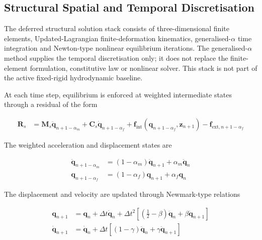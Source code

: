 \subsection{Structural Spatial and Temporal Discretisation}
\label{subsec:res_str_sim_spatial_temporal_discretisation}

The deferred structural solution stack consists of three-dimensional finite elements, Updated-Lagrangian finite-deformation kinematics, generalised-\(\alpha\) time integration and Newton-type nonlinear equilibrium iterations. The generalised-\(\alpha\) method supplies the temporal discretisation only; it does not replace the finite-element formulation, constitutive law or nonlinear solver. This stack is not part of the active fixed-rigid hydrodynamic baseline.

At each time step, equilibrium is enforced at weighted intermediate states through a residual of the form

\begin{align}
\bm{R}_{s}
&=
\bm{M}_{s}\ddot{\bm{q}}_{n+1-\alpha_{m}}
+
\bm{C}_{s}\dot{\bm{q}}_{n+1-\alpha_{f}}
+
\bm{f}_{\mathrm{int}}\!\left(\bm{q}_{n+1-\alpha_{f}},\bm{z}_{n+1}\right)
-
\bm{f}_{\mathrm{ext},n+1-\alpha_{f}}
\label{eq:res_str_sim_generalised_alpha_residual}
\end{align}

The weighted acceleration and displacement states are

\begin{align}
\ddot{\bm{q}}_{n+1-\alpha_{m}}
&=
\left(1-\alpha_{m}\right)\ddot{\bm{q}}_{n+1}
+
\alpha_{m}\ddot{\bm{q}}_{n}
\label{eq:res_str_sim_weighted_acceleration}
\\
\bm{q}_{n+1-\alpha_{f}}
&=
\left(1-\alpha_{f}\right)\bm{q}_{n+1}
+
\alpha_{f}\bm{q}_{n}
\label{eq:res_str_sim_weighted_displacement}
\end{align}

The displacement and velocity are updated through Newmark-type relations

\begin{align}
\bm{q}_{n+1}
&=
\bm{q}_{n}
+
\Delta t\dot{\bm{q}}_{n}
+
\Delta t^{2}
\left[
\left(\frac{1}{2}-\beta\right)\ddot{\bm{q}}_{n}
+
\beta\ddot{\bm{q}}_{n+1}
\right]
\label{eq:res_str_sim_generalised_alpha_displacement_update}
\\
\dot{\bm{q}}_{n+1}
&=
\dot{\bm{q}}_{n}
+
\Delta t
\left[
\left(1-\gamma\right)\ddot{\bm{q}}_{n}
+
\gamma\ddot{\bm{q}}_{n+1}
\right]
\label{eq:res_str_sim_generalised_alpha_velocity_update}
\end{align}

